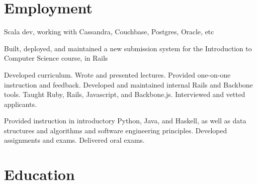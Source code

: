 \documentclass[letterpaper]{resume}
\begin{document}
\author{Buck Shlegeris}
\maketitle

\section{Employment}

\begin{compactitem}
\item Scala dev, working with Cassandra, Couchbase, Postgres, Oracle, etc
\end{compactitem}


\begin{compactitem}
\item Built, deployed, and maintained a new submission system for the Introduction to Computer Science course, in Rails
\end{compactitem}


\begin{compactitem}
\item Developed curriculum. Wrote and presented lectures. Provided one-on-one instruction and feedback. Developed and maintained internal Rails and Backbone tools. Taught Ruby, Rails, Javascript, and Backbone.js. Interviewed and vetted applicants.

\end{compactitem}


\begin{compactitem}
\item Provided instruction in introductory Python, Java, and Haskell, as well as data structures and algorithms and software engineering principles. Developed assignments and exams. Delivered oral exams.
\end{compactitem}


\section{Education}
\end{document}
